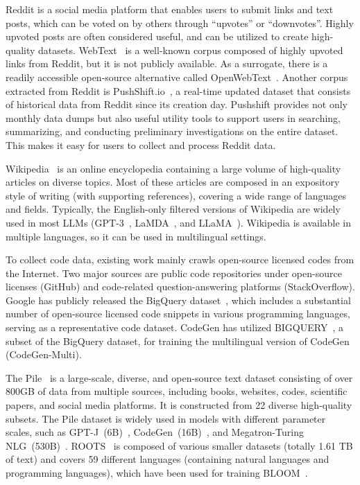 {{{ Reddit is a social media platform that enables users to submit links and text posts, which can be voted on by others through ``upvotes'' or ``downvotes''.  
Highly upvoted posts are often considered useful, and can be utilized to create high-quality datasets.
WebText~\cite{radford-blog-2019-language} is a well-known corpus composed of highly upvoted links from Reddit, but it is not publicly available.
As a surrogate, there is a readily accessible open-source alternative called OpenWebText~\cite{Gokaslan2019OpenWeb}.
Another corpus extracted from Reddit is PushShift.io~\cite{Baumgartner-AAAI-2020-The}, a {real-time updated dataset that consists of historical data from Reddit since its creation day}. 
{Pushshift provides not only monthly data dumps but also useful  utility tools to support users in searching, summarizing, and conducting preliminary investigations on the entire dataset. This makes it easy for users to collect and process Reddit data.} 


Wikipedia~\cite{Wikipedia} is an online encyclopedia containing a large volume of high-quality articles on diverse topics.
{Most of these articles are composed in an expository style of writing (with supporting references), covering a wide range of languages and fields. }
Typically, the English-only filtered versions of Wikipedia are widely used in most LLMs (\eg GPT-3~\cite{Brown-NeurIPS-2020-Language}, LaMDA~\cite{Thoppilan-CoRR-2022-LaMDA}, and LLaMA~\cite{Touvron-arxiv-2023-LLaMA}). Wikipedia is available in multiple languages,  so it can be used in multilingual settings.

 To collect code data, existing work mainly crawls open-source licensed codes from the Internet.
Two major sources are public code repositories  under open-source licenses (\eg  GitHub) and code-related question-answering platforms (\eg StackOverflow).
{Google has publicly released the BigQuery dataset~\cite{bigquery-google}, which includes a substantial number of open-source licensed code snippets in various programming languages, serving as a representative code dataset. CodeGen has utilized BIGQUERY~\cite{nijkamp-arxiv-2022-Codegen}, a subset of the BigQuery dataset, for training the multilingual version of CodeGen (CodeGen-Multi).}


 The Pile~\cite{Gao-arxiv-2021-Pile} is a large-scale, diverse, and open-source text dataset consisting of over 800GB of data from multiple sources, including books, websites, codes, scientific papers, and social media platforms. It is constructed from 22 diverse high-quality subsets.
The Pile dataset is widely used in models with different parameter scales, such as GPT-J~(6B)~\cite{Wang-GitHub-2021-GPT-J}, CodeGen~(16B)~\cite{nijkamp-arxiv-2022-Codegen}, and Megatron-Turing NLG~(530B)~\cite{Smith-CoRR-2022-Using}. 
ROOTS~\cite{Laurencon-NIPS-2022-The} is composed of various smaller datasets (totally 1.61 TB of text) and covers 59 different languages (containing natural languages and programming languages), which have been used for training BLOOM~\cite{Scao-arxiv-2022-BLOOM}.


}}}
